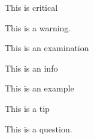 \documentclass{liyua}
\begin{document}
\pagestyle{plain}
\begin{critical}
	This is critical
\end{critical}
\begin{warning}
	This is a warning.
\end{warning}
\begin{examination}
	This is an examination
\end{examination}
\begin{info}
	This is an info
\end{info}
\begin{example}
	This is an example
\end{example}
\begin{tip}
	This is a tip
\end{tip}
\begin{question}
	This is a question.
\end{question}
\lipsum[1-10]
\end{document}
